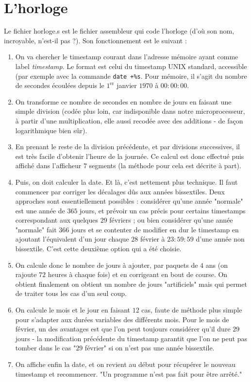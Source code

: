 \documentclass[13pt]{article}
\begin{document}
\section{L'horloge}

Le fichier horloge.s est le fichier assembleur qui code l'horloge (d'où son nom,
incroyable, n'est-il pas ?). Son fonctionnement est le suivant :

\begin{enumerate}
\item On va chercher le timestamp courant dans l'adresse mémoire ayant comme label
   \emph{timestamp}. Le format est celui du timestamp UNIX standard, accessible (par
   exemple avec la commande \texttt{date +\%s}. Pour mémoire, il s'agit du nombre de
   secondes écoulées depuis le $1^{\text{er}}$ janvier $1970$ à $00:00:00$.\\
\item On transforme ce nombre de secondes en nombre de jours en faisant une simple
   division (codée plus loin, car indisponible dans notre microprocesseur, à
   partir d'une multiplication, elle aussi recodée avec des additions - de façon
   logarithmique bien sûr).\\
\item En prenant le reste de la division précédente, et par divisions successives,
   il est très facile d'obtenir l'heure de la journée. Ce calcul est donc
   effectué puis affiché dans l'afficheur $7$ segments (la méthode pour cela est
   décrite à part).\\
\item Puis, on doit calculer la date. Et là, c'est nettement plus technique. Il
   faut commencer par corriger les décalages dûs aux années bissextiles. Deux
   approches sont essentiellement possibles : considérer qu'une année "normale"
   est une année de $365$ jours, et prévoir un cas précis pour certains timestamps
   correspondant aux quelques $29$ févriers ; ou bien considérer qu'une année
   "normale" fait $366$ jours et se contenter de modifier en dur le timestamp en
   ajoutant l'équivalent d'un jour chaque $28$ février à $23:59:59$ d'une année non
   bissextile. C'est cette deuxième option qui a été choisie.\\
\item On calcule donc le nombre de jours à ajouter, par paquets de $4$ ans (on
   rajoute $72$ heures à chaque fois) et en corrigeant en bout de course. On
   obtient finalement on obtient un nombre de jours
   "artificiels" mais qui permet de traiter tous les cas d'un seul coup.
\item On calcule le mois et le jour en faisant $12$ cas, faute de méthode plus simple
   pour s'adapter aux durées variables des différents mois. Pour le mois de
   février, un des avantages est que l'on peut toujours considérer qu'il dure $29$
   jours - la modification précédente du timestamp garantit que l'on ne peut pas
   tomber dans le cas "$29$ février" si on n'est pas une année bissextile.
\item On affiche enfin la date, et on revient au début pour récupérer le nouveau
   timestamp et recommencer. "Un programme n'est pas fait pour être arrêté."
\end{enumerate}
\end{document}
